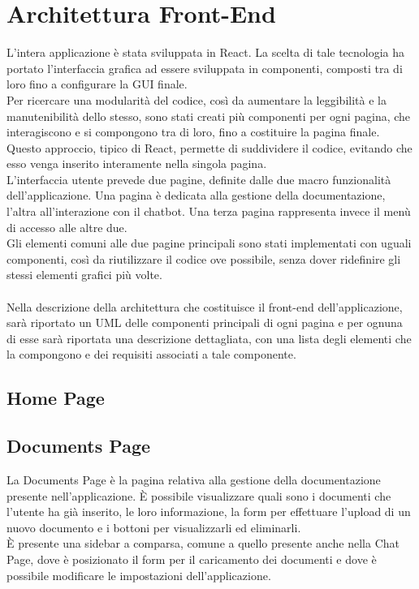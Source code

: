 \section{Architettura Front-End} \label{sec:archfront}
L'intera applicazione è stata sviluppata in React. La scelta di tale tecnologia ha portato l'interfaccia grafica ad essere sviluppata in componenti, composti tra di loro fino a configurare la GUI finale.\\
Per ricercare una modularità del codice, così da aumentare la leggibilità e la manutenibilità dello stesso, sono stati creati più componenti per ogni pagina, che interagiscono e si compongono tra di loro, fino a costituire la pagina finale. Questo approccio, tipico di React, permette di suddividere il codice, evitando che esso venga inserito interamente nella singola pagina.\\
L'interfaccia utente prevede due pagine, definite dalle due macro funzionalità dell'applicazione. Una pagina è dedicata alla gestione della documentazione, l'altra all'interazione con il chatbot. Una terza pagina rappresenta invece il menù di accesso alle altre due.\\
Gli elementi comuni alle due pagine principali sono stati implementati con uguali componenti, così da riutilizzare il codice ove possibile, senza dover ridefinire gli stessi elementi grafici più volte.\\ \\
Nella descrizione della architettura che costituisce il front-end dell'applicazione, sarà riportato un UML delle componenti principali di ogni pagina e per ognuna di esse sarà riportata una descrizione dettagliata, con una lista degli elementi che la compongono e dei requisiti associati a tale componente.
\newpage

\subsection{Home Page}

\newpage

\subsection{Documents Page}

La Documents Page è la pagina relativa alla gestione della documentazione presente nell'applicazione. È possibile visualizzare quali sono i documenti che l'utente ha già inserito, le loro informazione, la form per effettuare l'upload di un nuovo documento e i bottoni per visualizzarli ed eliminarli.\\
È presente una sidebar a comparsa, comune a quello presente anche nella Chat Page, dove è posizionato il form per il caricamento dei documenti e dove è possibile modificare le impostazioni dell'applicazione.

